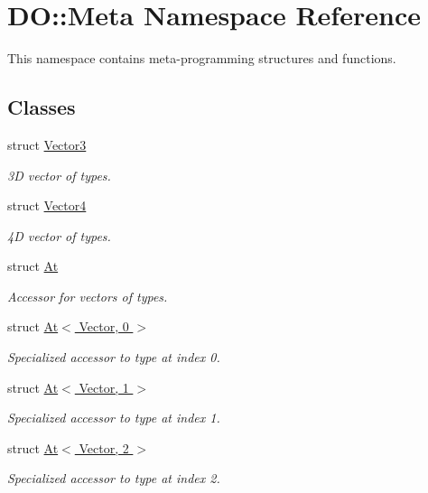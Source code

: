 \hypertarget{namespace_d_o_1_1_meta}{\section{D\-O\-:\-:Meta Namespace Reference}
\label{namespace_d_o_1_1_meta}
}


This namespace contains meta-\/programming structures and functions.  


\subsection*{Classes}
\begin{DoxyCompactItemize}
\item 
struct \hyperlink{struct_d_o_1_1_meta_1_1_vector3}{Vector3}
\begin{DoxyCompactList}\small\item\em 3\-D vector of types. \end{DoxyCompactList}\item 
struct \hyperlink{struct_d_o_1_1_meta_1_1_vector4}{Vector4}
\begin{DoxyCompactList}\small\item\em 4\-D vector of types. \end{DoxyCompactList}\item 
struct \hyperlink{struct_d_o_1_1_meta_1_1_at}{At}
\begin{DoxyCompactList}\small\item\em Accessor for vectors of types. \end{DoxyCompactList}\item 
struct \hyperlink{struct_d_o_1_1_meta_1_1_at_3_01_vector_00_010_01_4}{At$<$ Vector, 0 $>$}
\begin{DoxyCompactList}\small\item\em Specialized accessor to type at index 0. \end{DoxyCompactList}\item 
struct \hyperlink{struct_d_o_1_1_meta_1_1_at_3_01_vector_00_011_01_4}{At$<$ Vector, 1 $>$}
\begin{DoxyCompactList}\small\item\em Specialized accessor to type at index 1. \end{DoxyCompactList}\item 
struct \hyperlink{struct_d_o_1_1_meta_1_1_at_3_01_vector_00_012_01_4}{At$<$ Vector, 2 $>$}
\begin{DoxyCompactList}\small\item\em Specialized accessor to type at index 2. \end{DoxyCompactList}\item 

\end{DoxyCompactItemize}
